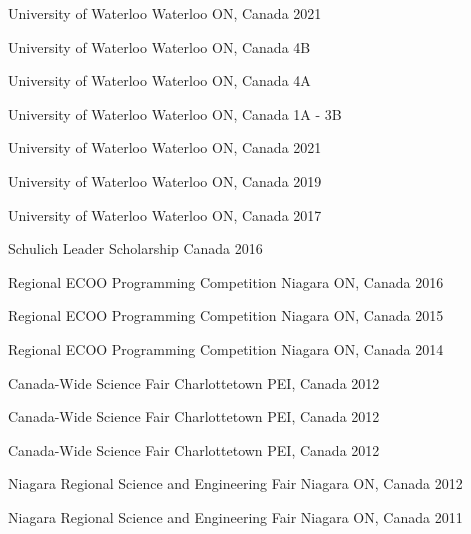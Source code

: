 
\begin{cvhonors}

   {University of Waterloo} {Waterloo ON, Canada}
  {2021}

   {University of Waterloo} {Waterloo ON, Canada}
  {4B}
  
   {University of Waterloo} {Waterloo ON, Canada}
  {4A}
  
   {University of Waterloo} {Waterloo ON, Canada}
  {1A - 3B}

   {University of Waterloo}
  {Waterloo ON, Canada} {2021}

   {University of Waterloo}
  {Waterloo ON, Canada} {2019}

   {University of Waterloo}
  {Waterloo ON, Canada} {2017}

   {Schulich Leader Scholarship} {Canada} {2016}

   {Regional ECOO Programming Competition} {Niagara ON,
    Canada} {2016}

   {Regional ECOO Programming Competition} {Niagara ON,
    Canada} {2015}

   {Regional ECOO Programming Competition} {Niagara ON,
    Canada} {2014}

   {Canada-Wide Science Fair} {Charlottetown PEI, Canada}
  {2012}

   {Canada-Wide Science Fair} {Charlottetown
    PEI, Canada} {2012}

   {Canada-Wide Science Fair}
  {Charlottetown PEI, Canada} {2012}

   {Niagara Regional Science and Engineering Fair} {Niagara
    ON, Canada} {2012}

   {Niagara Regional Science and Engineering Fair} {Niagara
    ON, Canada} {2011}

\end{cvhonors}
